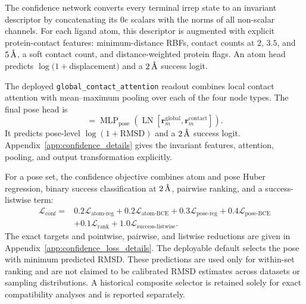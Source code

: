 The confidence network converts every terminal irrep state to an invariant
descriptor by concatenating its \(0e\) scalars with the norms of all
non-scalar channels. For each ligand atom, this descriptor is augmented with
explicit protein-contact features: minimum-distance RBFs, contact counts at
\(2\), \(3.5\), and \(5\,\text{\normalfont\AA}\), a soft contact count, and
distance-weighted protein flags. An atom head predicts
\(\log(1+\)displacement\()\) and a \(2\,\text{\normalfont\AA}\) success logit.

The deployed \texttt{global\_contact\_attention} readout combines local
contact attention with mean--maximum pooling over each of the four node types.
The final pose head is
\begin{equation}
    [\widehat{\ell}^{\,\mathrm{pose}}_m,
      \widehat{o}^{\,\mathrm{pose}}_m]
    =
    \operatorname{MLP}_{\mathrm{pose}}
    \left(
      \operatorname{LN}
      [\mathbf{r}^{\mathrm{global}}_m,
       \mathbf{r}^{\mathrm{contact}}_m]
    \right).
    \label{eq:confidence_pose_head}
\end{equation}
It predicts pose-level \(\log(1+\mathrm{RMSD})\) and a \(2\,\text{\normalfont\AA}\)
success logit. Appendix~\ref{app:confidence_details} gives the invariant
features, attention, pooling, and output transformation explicitly.

For a pose set, the confidence objective combines atom and pose Huber
regression, binary success classification at \(2\,\text{\normalfont\AA}\), pairwise
ranking, and a success-listwise term:
\begin{align}
    \mathcal{L}_{\mathrm{conf}}
    ={}&
    0.2\mathcal{L}_{\mathrm{atom\text{-}reg}}
    +0.2\mathcal{L}_{\mathrm{atom\text{-}BCE}}
    +0.3\mathcal{L}_{\mathrm{pose\text{-}reg}}
    +0.4\mathcal{L}_{\mathrm{pose\text{-}BCE}}
    \nonumber\\
    &+
    0.1\mathcal{L}_{\mathrm{rank}}
    +1.0\mathcal{L}_{\mathrm{success\text{-}listwise}}.
    \label{eq:confidence_loss}
\end{align}
The exact targets and pointwise, pairwise, and listwise reductions are given
in Appendix~\ref{app:confidence_loss_details}. The deployable default selects
the pose with minimum predicted RMSD. These predictions are used only for
within-set ranking and are not claimed to be calibrated RMSD estimates across
datasets or sampling distributions. A historical composite selector is
retained solely for exact compatibility analyses and is reported separately.
